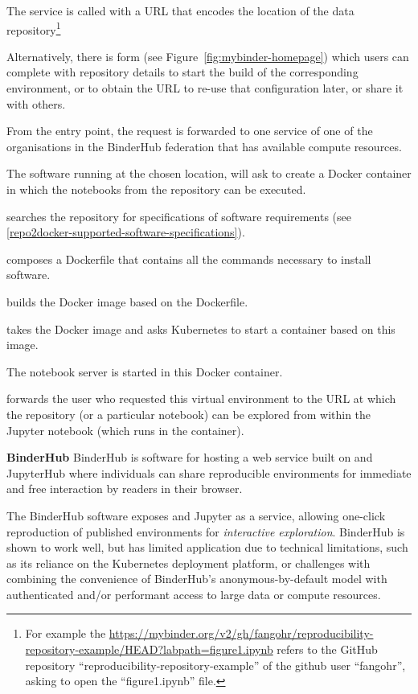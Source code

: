 \begin{compactitem}
\item The \mybinder{} service is called with a URL that encodes the location of the data
  repository\footnote{For example the
    {\url{https://mybinder.org/v2/gh/fangohr/reproducibility-repository-example/HEAD?labpath=figure1.ipynb}}
    refers to the GitHub repository ``reproducibility-repository-example'' of the
    github user ``fangohr'', asking to open the ``figure1.ipynb'' file.}

  Alternatively, there is form (see Figure~\ref{fig:mybinder-homepage})
  which users can complete with repository details
  to start the build of the corresponding environment, or to obtain the URL to
  re-use that configuration later, or share it with others.
\item From the \mybinder{} entry point, the request is forwarded to one
  \binderhub{} service of one of the organisations in the BinderHub federation
  that has available compute resources.
\item The \binderhub{} software running at the chosen location, will ask
  \repotodocker{} to create a Docker container in which the notebooks from the repository can be executed.
\item \repotodocker{} searches the repository for specifications of software requirements (see \ref{repo2docker-supported-software-specifications}).
\item \repotodocker{} composes a Dockerfile that contains all the commands
  necessary to install software.
\item \repotodocker{} builds the Docker image based on the Dockerfile.
\item \binderhub{} takes the Docker image and asks Kubernetes to start
  a container based on this image.
\item The notebook server is started in this Docker container.
\item \binderhub{} forwards the user who requested this virtual environment to
  the URL at which the repository (or a particular notebook) can be explored
  from within the Jupyter notebook (which runs in the container).
\end{compactitem}


\textbf{BinderHub}\label{sec:binderhub}
BinderHub is software for hosting a web service built on \repotodocker{} and
JupyterHub where individuals can share reproducible environments for
immediate and free interaction by readers in their browser.


The BinderHub software exposes \repotodocker{} and Jupyter as a service,
allowing one-click reproduction of published environments for \emph{interactive exploration}.
BinderHub is shown to work well,
but has limited application due to technical limitations,
such as its reliance on the Kubernetes deployment platform,
or challenges with combining the convenience of BinderHub's anonymous-by-default model
with authenticated and/or performant access to large data or compute resources.

